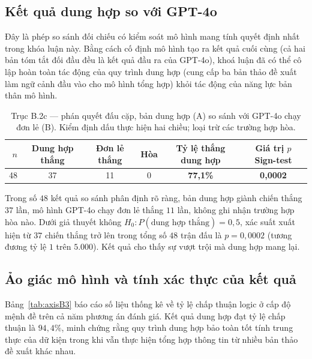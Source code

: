 \subsection{Kết quả dung hợp so với GPT-4o}

Đây là phép so sánh đối chiếu có kiểm soát mô hình mang tính quyết định nhất trong khóa luận này. Bằng cách cố định mô hình tạo ra kết quả cuối cùng (cả hai bản tóm tắt đối đầu đều là kết quả đầu ra của GPT-4o), khoá luận đã có thể cô lập hoàn toàn tác động của quy trình dung hợp (cung cấp ba bản thảo đề xuất làm ngữ cảnh đầu vào cho mô hình tổng hợp) khỏi tác động của năng lực bản thân mô hình.

\begin{table}[H]
  \centering
  \caption{Trục B.2c --- phán quyết đấu cặp, bản dung hợp (A) so sánh với GPT-4o chạy đơn lẻ (B). Kiểm định dấu thực hiện hai chiều; loại trừ các trường hợp hòa.}
  \label{tab:axisB2c}
  \begin{tabularx}{\linewidth}{r c c c C C}
    \toprule
    $n$ & Dung hợp thắng & Đơn lẻ thắng & Hòa & Tỷ lệ thắng dung hợp & Giá trị $p$ Sign-test \\
     & 37 & 11 & 0 & \textbf{77,1\%} & \textbf{0,0002} \\
    \bottomrule
  \end{tabularx}
\end{table}

Trong số $48$ kết quả so sánh phân định rõ ràng, bản dung hợp giành chiến thắng $37$ lần, mô hình GPT-4o chạy đơn lẻ thắng $11$ lần, không ghi nhận trường hợp hòa nào. Dưới giả thuyết không $H_0: P(\text{dung hợp thắng}) = 0,5$, xác suất xuất hiện từ $37$ chiến thắng trở lên trong tổng số $48$ trận đấu là $p = 0,0002$ (tương đương tỷ lệ $1$ trên $5.000$). Kết quả cho thấy sự vượt trội mà dung hợp mang lại.
\subsection{Ảo giác mô hình và tính xác thực của kết quả}

Bảng~\ref{tab:axisB3} báo cáo số liệu thống kê về tỷ lệ chấp thuận logic ở cấp độ mệnh đề trên cả năm phương án đánh giá. Kết quả dung hợp đạt tỷ lệ chấp thuận là $94,4\%$, minh chứng rằng quy trình dung hợp bảo toàn tốt tính trung thực của dữ kiện trong khi vẫn thực hiện tổng hợp thông tin từ nhiều bản thảo đề xuất khác nhau.


